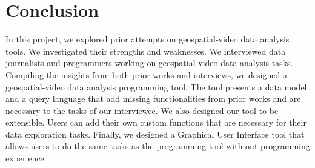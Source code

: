 
\section{Conclusion}

In this project, we explored prior attempts on geospatial-video data analysis tools.
We investigated their strengths and weaknesses.
We interviewed data journalists and programmers working on geospatial-video data analysis tasks.
Compiling the insights from both prior works and interviews, we designed a geospatial-video data analysis programming tool.
The tool presents a data model and a query language that add missing functionalities from prior works and are necessary to the tasks of our interviewee.
We also designed our tool to be extensible.
Users can add their own custom functions that are necessary for their data exploration tasks.
Finally, we designed a Graphical User Interface tool that allows users to do the same tasks as the programming tool with out programming experience.